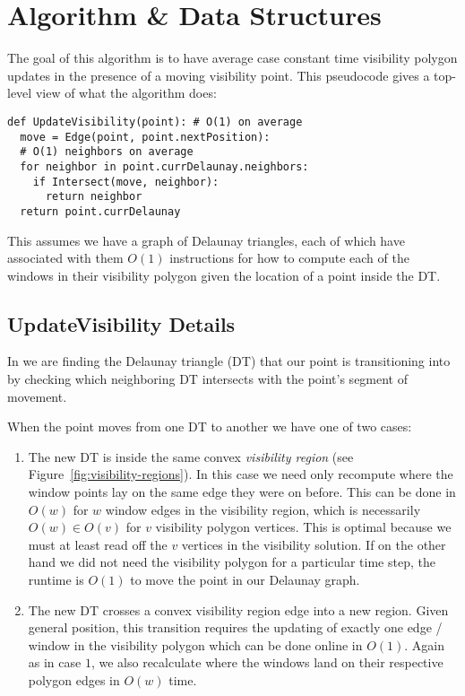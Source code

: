 \section{Algorithm \& Data Structures} \label{sec:algorithm}

The goal of this algorithm is to have average case constant time
visibility polygon updates in the presence of a moving visibility point. This
 pseudocode gives a top-level view of what the
algorithm does:

\begin{verbatim}
def UpdateVisibility(point): # O(1) on average
  move = Edge(point, point.nextPosition):
  # O(1) neighbors on average
  for neighbor in point.currDelaunay.neighbors:
    if Intersect(move, neighbor):
      return neighbor
  return point.currDelaunay
\end{verbatim}

This assumes we have a graph of Delaunay triangles, each of which have
associated with them $O(1)$ instructions for how to compute each of the
windows in their visibility polygon given the location of a point inside
the DT.

\subsection{UpdateVisibility Details}

In  we are finding the Delaunay triangle (DT) that our
point is transitioning into by checking which neighboring DT
intersects with the point's segment of movement.

When the point moves from one DT to another we have one of two cases:

\begin{enumerate}
  \item The new DT is inside the same convex \emph{visibility region}
    (see Figure~\ref{fig:visibility-regions}). In this
    case we need only recompute where the window points lay on the same
    edge they were on before. This can be done in $O(w)$ for $w$ window
    edges in the visibility region, which is necessarily $O(w) \in O(v)$
    for $v$ visibility polygon vertices. This is optimal because we must
    at least read off the $v$ vertices in the visibility solution. If on
    the other hand we did not need the visibility polygon for a particular
    time step, the runtime is $O(1)$ to move the point in our Delaunay
    graph.
  \item The new DT crosses a convex visibility region edge into a new
    region. Given general position, this transition requires the
    updating of exactly one edge / window in the visibility polygon
    which can be done online in $O(1)$. Again as in case $1$, we also
    recalculate where the windows land on their respective polygon
    edges in $O(w)$ time.
\end{enumerate}

